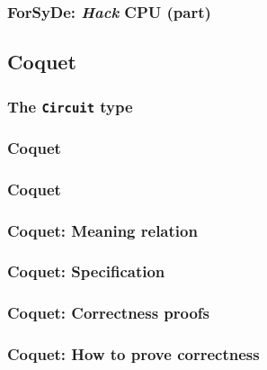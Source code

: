 \documentclass{beamer}
\begin{document}
            \begin{frame}
                \frametitle{ForSyDe: \emph{Hack} CPU (part)}
            \end{frame}


        \subsection{Coquet}
        \label{subsec:coquet}
            \begin{frame}
                \frametitle{The \texttt{Circuit} type}
            \end{frame}

            \begin{frame}
                \frametitle{Coquet}
            \end{frame}

            \begin{frame}
                \frametitle{Coquet}
            \end{frame}

            \begin{frame}
                \frametitle{Coquet: Meaning relation}
            \end{frame}

            \begin{frame}
                \frametitle{Coquet: Specification}
            \end{frame}

            \begin{frame}
                \frametitle{Coquet: Correctness proofs}
            \end{frame}

            \begin{frame}
                \frametitle{Coquet: How to prove correctness}
            \end{frame}
\end{document}

